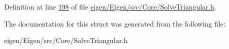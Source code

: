 Definition at line \hyperlink{eigen_2_eigen_2src_2_core_2_solve_triangular_8h_source_l00198}{198} of file \hyperlink{eigen_2_eigen_2src_2_core_2_solve_triangular_8h_source}{eigen/\+Eigen/src/\+Core/\+Solve\+Triangular.\+h}.



The documentation for this struct was generated from the following file\+:\begin{DoxyCompactItemize}
\item 
eigen/\+Eigen/src/\+Core/\+Solve\+Triangular.\+h\end{DoxyCompactItemize}
